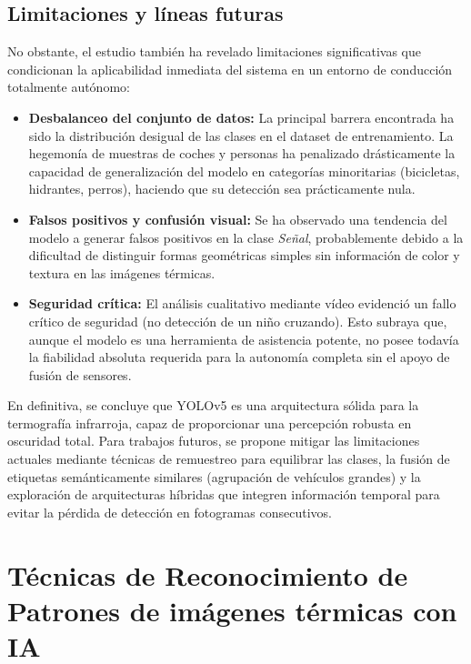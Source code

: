 \documentclass{article}
\begin{document}
\subsection{Limitaciones y líneas futuras}
No obstante, el estudio también ha revelado limitaciones significativas que condicionan la aplicabilidad inmediata del sistema en un entorno de conducción totalmente autónomo:

\begin{itemize}
	\item \textbf{Desbalanceo del conjunto de datos:} La principal barrera encontrada ha sido la distribución desigual de las clases en el dataset de entrenamiento. La hegemonía de muestras de coches y personas ha penalizado drásticamente la capacidad de generalización del modelo en categorías minoritarias (bicicletas, hidrantes, perros), haciendo que su detección sea prácticamente nula.
	\item \textbf{Falsos positivos y confusión visual:} Se ha observado una tendencia del modelo a generar falsos positivos en la clase \textit{Señal}, probablemente debido a la dificultad de distinguir formas geométricas simples sin información de color y textura en las imágenes térmicas.
	\item \textbf{Seguridad crítica:} El análisis cualitativo mediante vídeo evidenció un fallo crítico de seguridad (no detección de un niño cruzando). Esto subraya que, aunque el modelo es una herramienta de asistencia potente, no posee todavía la fiabilidad absoluta requerida para la autonomía completa sin el apoyo de fusión de sensores.
\end{itemize}

En definitiva, se concluye que YOLOv5 es una arquitectura sólida para la termografía infrarroja, capaz de proporcionar una percepción robusta en oscuridad total. Para trabajos futuros, se propone mitigar las limitaciones actuales mediante técnicas de remuestreo para equilibrar las clases, la fusión de etiquetas semánticamente similares (agrupación de vehículos grandes) y la exploración de arquitecturas híbridas que integren información temporal para evitar la pérdida de detección en fotogramas consecutivos.
\newpage

 

\newpage
\appendix %

\section{Técnicas de Reconocimiento de Patrones de imágenes térmicas con IA}
\label{anexo:patrones}
\end{document}
